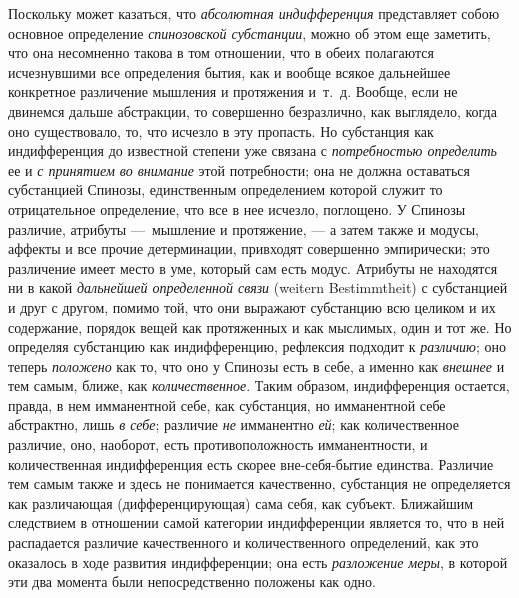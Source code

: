 Поскольку может казаться, что {\em абсолютная
индифференция} представляет собою основное определение
{\em спинозовской субстанции}, можно об этом еще
заметить, что она несомненно такова в том отношении, что в обеих полагаются
исчезнувшими все определения бытия, как и вообще всякое дальнейшее
конкретное различение мышления и протяжения и~т.~д. Вообще, если не
двинемся дальше абстракции, то совершенно безразлично, как выглядело, когда
оно существовало, то, что исчезло в эту пропасть. Но субстанция как
индифференция до известной степени уже связана с
{\em потребностью определить} ее и
{\em с принятием во внимание} этой потребности; она не
должна оставаться субстанцией Спинозы, единственным определением которой
служит то отрицательное определение, что все в нее исчезло,
поглощено.
У Спинозы различие, атрибуты —~мышление и протяжение, — а затем также и
модусы, аффекты и все прочие детерминации, привходят совершенно
эмпирически; это различение имеет место в уме, который сам есть модус.
Атрибуты не находятся ни в какой {\em дальнейшей
определенной связи} (weitern Bestimmtheit) с субстанцией и друг с другом,
помимо той, что они выражают субстанцию всю целиком и их содержание,
порядок вещей как протяженных и как мыслимых, один и тот же. Но определяя
субстанцию как индифференцию, рефлексия подходит к
{\em различию}; оно теперь
{\em положено} как то, что оно у Спинозы есть в себе, а
именно как {\em внешнее} и тем самым, ближе, как
{\em количественное}. Таким образом, индифференция
остается, правда, в нем имманентной себе, как субстанция, но имманентной
себе абстрактно, лишь {\em в себе}; различие
{\em не} имманентно {\em ей}; как
количественное различие, оно, наоборот, есть противоположность
имманентности, и количественная индифференция есть скорее вне-себя-бытие
единства. Различие тем самым также и здесь не понимается качественно,
субстанция не определяется как различающая (дифференцирующая) сама себя, как
субъект. Ближайшим следствием в отношении самой категории индифференции
является то, что в ней распадается различие качественного и количественного
определений, как это оказалось в ходе развития индифференции; она есть
{\em разложение меры}, в которой эти два момента были
непосредственно положены как одно.

